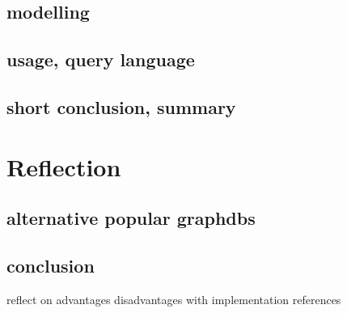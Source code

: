 \subsection{modelling}
\subsection{usage, query language}
\subsection{short conclusion, summary}

\section{Reflection}
\subsection{alternative popular graphdbs}
\subsection{conclusion}
reflect on advantages disadvantages with implementation references

